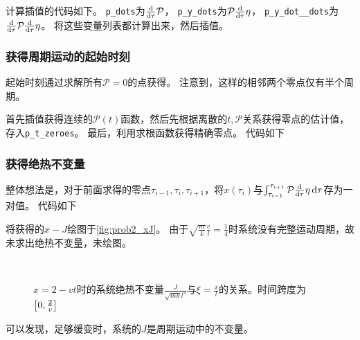\documentclass[a4paper,unicode]{report}
\begin{document}
计算插值的代码如下。
\verb|p_dots|为$\dv{\tau}\mathcal{P}$， \verb|p_y_dots|为$\mathcal{P}\dv{\tau}\eta$， \verb|p_y_dot__dots|为$\dv{\tau}\mathcal{P}\dv{\tau}\eta$。
将这些变量列表都计算出来，然后插值。
{
    \linespread{1.0}
    
}

\subsubsection{获得周期运动的起始时刻}

起始时刻通过求解所有$\mathcal{P}=0$的点获得。
注意到，这样的相邻两个零点仅有半个周期。

首先插值获得连续的$\mathcal{P}(t)$函数，然后先根据离散的$t, \mathcal{P}$关系获得零点的估计值，存入\verb|p_t_zeroes|。
最后，利用求根函数获得精确零点。
代码如下
{
    \linespread{1.0}
    
}

\subsubsection{获得绝热不变量}

整体想法是，对于前面求得的零点$\tau_{i-1}, \tau_i, \tau_{i+1}$，将$x(\tau_i)$与$\int_{\tau_{i-1}}^{\tau_{i+1}}\mathcal{P}\dv{\tau}\eta \dd{\tau}$存为一对值。
代码如下
{
    \linespread{1.0}
    
}

将获得的$x-J$绘图于\autoref{fig:prob2_xJ}。
由于$\sqrt{\frac{m}{k}}\frac{v}{l}=\frac{1}{4}$时系统没有完整运动周期，故未求出绝热不变量，未绘图。

\begin{figure}
    \centering
    \\
    \caption{$x=2-vt$时的系统绝热不变量$\frac{J}{\sqrt{mk}l^2}$与$\xi = \frac{x}{l}$的关系。时间跨度为$\qty[0, \frac{2}{v}]$}
    \label{fig:prob2_xJ}
\end{figure}

可以发现，足够缓变时，系统的$J$是周期运动中的不变量。
\end{document}
